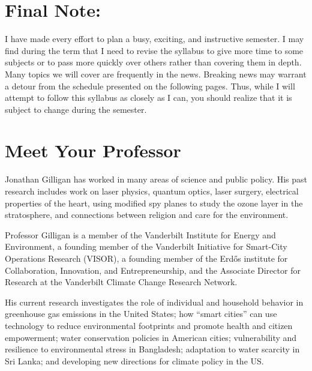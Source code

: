 \documentclass[11pt,twoside]{jgsyllabus}\usepackage[]{graphicx}\usepackage[]{color}
\begin{document}
\section{Final Note:}
I have made every effort to plan a busy, exciting, and instructive semester.
I may find during the term that I need to revise the syllabus to give more time
to some subjects or to pass more quickly over others rather than covering them
in depth. Many topics we will cover are frequently in the news. Breaking news
may warrant a detour from the schedule presented on the following pages.
Thus, while I will attempt to follow this syllabus as closely as I can,
you should realize that it is subject to change during the semester.

\clearpage
\section{Meet Your Professor}
Jonathan Gilligan has worked in many areas of science and public policy.
His past research includes work on laser physics, quantum optics,
laser surgery, electrical properties of the heart, using modified spy planes to
study the ozone layer in the stratosphere, and connections between religion and
care for the environment.
\iffalse

Professor Gilligan joined the Vanderbilt Faculty in 1994 as a member of the
Department of Physics and Astronomy. In 2003, when the Department of Geology
became the Department of Earth and Environmental Science, Professor Gilligan
joined the new department to focus on atmospheric science, global climate change,
and the interactions of politics, ethics, religion, communication, and the
environment.
\fi

Professor Gilligan is a member of the Vanderbilt Institute for Energy and Environment,
a founding member of the Vanderbilt Initiative for Smart-City Operations Research (VISOR),
a founding member of the Erd\H{o}s institute for Collaboration, Innovation, and
Entrepreneurship,
and the Associate Director for Research at the Vanderbilt Climate Change Research Network.

His current research investigates the role of individual and household behavior
in greenhouse gas emissions in the United States;
how ``smart cities'' can use technology to reduce environmental footprints and
promote health and citizen empowerment;
water conservation policies in American cities;
vulnerability and resilience to environmental stress in Bangladesh;
adaptation to water scarcity in Sri Lanka;
and developing new directions for climate policy in the US.
\end{document}
